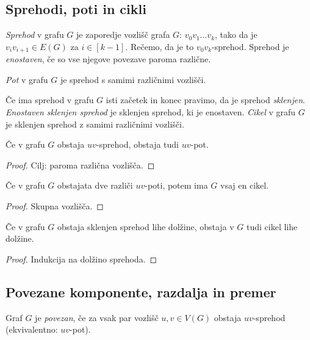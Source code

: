 \subsection{Sprehodi, poti in cikli}
\begin{definicija}
    \emph{Sprehod} v grafu $G$ je zaporedje vozlišč grafa $G$: $v_0v_1\ldots v_k$, tako da je $v_iv_{i+1} \in E(G)$ za $i \in [k-1]$. Rečemo, da je to $v_0v_k$-sprehod. Sprehod je \emph{enostaven}, če so vse njegove povezave paroma različne.
\end{definicija}

\begin{definicija}
    \emph{Pot} v grafu $G$ je sprehod s samimi različnimi vozlišči.
\end{definicija}

\begin{definicija}
    Če ima sprehod v grafu $G$ isti začetek in konec pravimo, da je sprehod \emph{sklenjen}. \emph{Enostaven sklenjen sprehod} je sklenjen sprehod, ki je enostaven. \emph{Cikel} v grafu $G$ je sklenjen sprehod z samimi različnimi vozlišči.
\end{definicija}

\begin{lema}
    Če v grafu $G$ obstaja $uv$-sprehod, obstaja tudi $uv$-pot.
\end{lema}

\begin{proof}
    Cilj: paroma različna vozlišča.
\end{proof}

\begin{lema}
    Če v grafu $G$ obstajata dve različi $uv$-poti, potem ima $G$ vsaj en cikel.
\end{lema}

\begin{proof}
    Skupna vozlišča.
\end{proof}

\begin{lema}
    Če v grafu $G$ obstaja sklenjen sprehod lihe dolžine, obstaja v $G$ tudi cikel lihe dolžine.
\end{lema}

\begin{proof}
    Indukcija na dolžino sprehoda.
\end{proof}

\subsection{Povezane komponente, razdalja in premer}
\begin{definicija}
    Graf $G$ je \emph{povezan}, če za vsak par vozlišč $u, v \in V(G)$ obstaja $uv$-sprehod (ekvivalentno: $uv$-pot).
\end{definicija}

